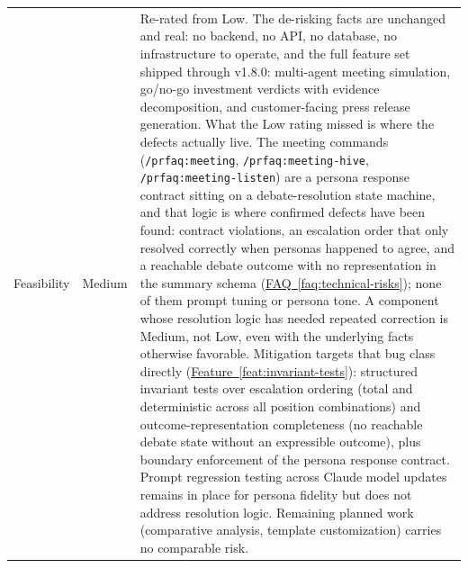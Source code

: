 \documentclass[11pt,letterpaper]{article}
\newcommand{\faqref}[1]{\hyperref[#1]{FAQ~\ref*{#1}}}
\newcommand{\featureref}[1]{\hyperref[#1]{Feature~\ref*{#1}}}
\begin{document}
\begin{tabularx}{\textwidth}{@{} l l X @{}}
Feasibility & \textcolor{RiskAmber}{Medium} & Re-rated from Low. The de-risking facts are unchanged and real: no backend, no API, no database, no infrastructure to operate, and the full feature set shipped through v1.8.0: multi-agent meeting simulation, go/no-go investment verdicts with evidence decomposition, and customer-facing press release generation. What the Low rating missed is where the defects actually live. The meeting commands (\texttt{/prfaq:meeting}, \texttt{/prfaq:meeting-hive}, \texttt{/prfaq:meeting-listen}) are a persona response contract sitting on a debate-resolution state machine, and that logic is where confirmed defects have been found: contract violations, an escalation order that only resolved correctly when personas happened to agree, and a reachable debate outcome with no representation in the summary schema (\faqref{faq:technical-risks}); none of them prompt tuning or persona tone. A component whose resolution logic has needed repeated correction is Medium, not Low, even with the underlying facts otherwise favorable. Mitigation targets that bug class directly (\featureref{feat:invariant-tests}): structured invariant tests over escalation ordering (total and deterministic across all position combinations) and outcome-representation completeness (no reachable debate state without an expressible outcome), plus boundary enforcement of the persona response contract. Prompt regression testing across Claude model updates remains in place for persona fidelity but does not address resolution logic. Remaining planned work (comparative analysis, template customization) carries no comparable risk. \\

\end{tabularx}
\end{document}
